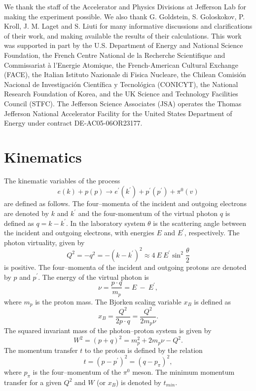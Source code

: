 \documentclass[prc,floatfix,twocolumn,superscriptaddress,letter]{revtex4}
\begin{document}
\begin{acknowledgements}

We thank  the staff of the Accelerator and Physics Divisions at Jefferson Lab for making the experiment possible. We also thank G. Goldstein, S. Goloskokov, P. Kroll, J. M. Laget and S. Liuti  for many informative discussions and clarifications of their work, and making available the results of their calculations. 
This work was supported in part by 
the U.S. Department of Energy and National Science Foundation, 
the French Centre National de la Recherche Scientifique and Commissariat  \`a l'Energie Atomique, the French-American Cultural Exchange (FACE),
the Italian Istituto Nazionale di Fisica Nucleare, 
the Chilean Comisi\'on Nacional de Investigaci\'on Cient\'ifica y Tecnol\'ogica (CONICYT),
the National Research Foundation of Korea, 
and the UK Science and Technology Facilities
Council (STFC).
The Jefferson Science Associates (JSA) operates the Thomas Jefferson National Accelerator Facility for 
the United States Department of Energy under contract DE-AC05-06OR23177. 
\end{acknowledgements}

\appendix
\section{Kinematics}
\label{section:kinematics}
The kinematic variables of the process
$$
e(k) + p(p) \rightarrow e^\prime(k^\prime) +  p^\prime(p^\prime) + \pi^0(v)
$$
are defined as follows. The four--momenta of the incident and outgoing electrons are denoted by $k$ and $k^\prime$ and
the four-momentum of the virtual photon $q$ is defined as $q=k-k^\prime$. In the laboratory system $\theta$ is the scattering angle between the incident and outgoing electrons, with energies $E$ and $E^\prime$, respectively.
 The photon virtuality, given by
\begin{equation}
Q^2=-q^2=-(k-k^\prime)^2 \approx 4 \ E \  E^\prime \sin^2\frac{\theta}{2}
\end{equation}
is positive. 
The four--momenta of the incident and outgoing protons are denoted by $p$ and $p^\prime$.
The energy of the virtual photon is  
\begin{equation}
\nu=\frac{p \cdot q}{m_p}=E\ - \ E ^\prime, 
\end{equation}
where $m_p$ is the proton mass.
The Bjorken scaling variable $x_B$ is defined as
\begin{equation}
x_B=\frac{Q^2}{2p\cdot q}=\frac{Q^2}{2m_p\nu}.
\end{equation}
The squared invariant mass of the photon--proton system is given by
\begin{equation}
W^2=(p+q)^2=m_p^2+2m_p\nu-Q^2.
\end{equation}
The momentum transfer $t$ to the proton is defined by the relation
\begin{equation}
t=(p-p^\prime)^2=(q-p_\pi)^2,
\end{equation}
where $p_\pi$ is the four--momentum of the $\pi^0$ meson.  The minimum momentum transfer for a given $Q^2$ and $W$ (or $x_B$)  is denoted by $t_{min}$. 
\end{document}
